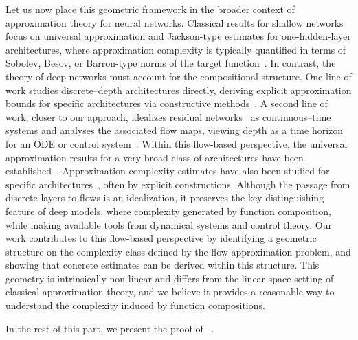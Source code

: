 \documentclass[12pt]{amsart}
\numberwithin{equation}{section}
\theoremstyle{remark}
\begin{document}
Let us now place this geometric framework in the broader context of approximation theory for neural networks.
Classical results for shallow networks focus on universal approximation and Jackson-type estimates for one-hidden-layer architectures, where approximation complexity is typically quantified in terms of Sobolev, Besov, or Barron-type norms of the target function~\cite{cybenko1989approximation, hornik1991approximation, barron2002universal, ma2022barron,siegel2023characterization,siegel2020approximation}.
In contrast, the theory of deep networks must account for the compositional structure.
One line of work studies discrete–depth architectures directly, deriving explicit approximation bounds for specific architectures via constructive methods~\cite{lu2021deep,shen2019deep,shen2022optimal,shen2021neural, yarotsky2017error,yarotsky2018optimal}.
A second line of work, closer to our approach, idealizes residual networks~\cite{he2016deep} as continuous–time systems and analyses the associated flow maps, viewing depth as a time horizon for an ODE or control system~\cite{weinan2017proposal,ruthotto2020deep,li2018maximum}.
Within this flow-based perspective, the universal approximation results for a very broad class of architectures have been established~\cite{agrachev2022control,li2022deep,cheng2025interpolation,ruiz2023neural,tabuada2022universal,cheng2025unified}. Approximation complexity estimates have also been studied for specific architectures~\cite{geshkovski2024measure,ruiz2023neural, li2022deep}, often by explicit constructions.
Although the passage from discrete layers to flows is an idealization, it preserves the key distinguishing feature of
deep models, where complexity generated by function composition, while
making available tools from dynamical systems and control theory.
Our work contributes to this flow-based perspective by identifying a geometric structure on the complexity class defined by the flow approximation problem, and showing that concrete estimates can be derived within this structure.
This geometry is intrinsically non-linear and differs from the linear space setting of classical approximation theory, and we believe it provides a reasonable way to understand the complexity induced by function compositions.

In the rest of this part, we present the proof of ~.
\label{subsec:proof_thm_51}
\end{document}
